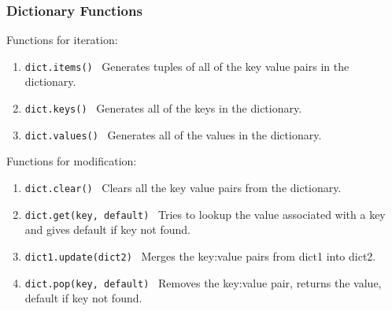 \documentclass{beamer}
\begin{document}
%
%
\begin{frame}[fragile]
  \frametitle{Dictionary Functions}
  Functions for iteration:
  \begin{enumerate}
    \item \lstinline|dict.items()| \textrightarrow \ Generates tuples of all of the key value pairs in the dictionary.
    \item \lstinline|dict.keys()| \textrightarrow \ Generates all of the keys in the dictionary.
    \item \lstinline|dict.values()| \textrightarrow \ Generates all of the values in the dictionary.
  \end{enumerate}
  \vfill
  Functions for modification:
  \begin{enumerate}
    \item \lstinline|dict.clear()| \textrightarrow \ Clears all the key value pairs from the dictionary.
    \item \lstinline|dict.get(key, default)| \textrightarrow \ Tries to lookup the value associated with a key and gives default if key not found.
    \item \lstinline|dict1.update(dict2)| \textrightarrow \ Merges the key:value pairs from dict1 into dict2. 
    \item \lstinline|dict.pop(key, default)| \textrightarrow \ Removes the key:value pair, returns the value, default if key not found.
  \end{enumerate}
\end{frame}
\end{document}
